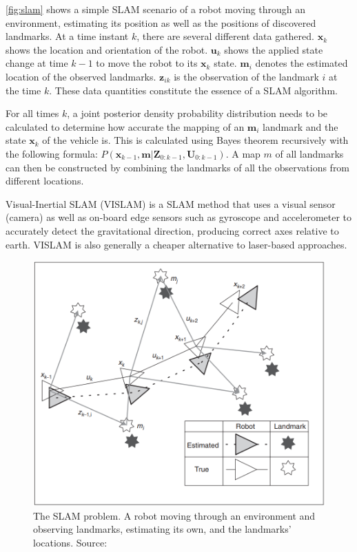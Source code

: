 \documentclass{article}
\begin{document}
\autoref{fig:slam} shows a simple SLAM scenario of a robot moving through an environment, estimating its position as well as the positions of discovered landmarks. At a time instant $k$, there are several different data gathered. $\textbf{x}_k$ shows the location and orientation of the robot. $\textbf{u}_k$ shows the applied state change at time $k-1$ to move the robot to its $\textbf{x}_k$ state. $\textbf{m}_i$ denotes the estimated location of the observed landmarks. $\textbf{z}_{ik}$ is the observation of the landmark $i$ at the time $k$. These data quantities constitute the essence of a SLAM algorithm. \cite{background1}

For all times $k$, a joint posterior density probability distribution needs to be calculated to determine how accurate the mapping of an $\textbf{m}_i$ landmark and the state $\textbf{x}_k$ of the vehicle is. This is calculated using Bayes theorem recursively with the following formula: $P(\textbf{x}_{k-1}, \textbf{m} | \textbf{Z}_{0:k-1}, \textbf{U}_{0:k-1})$. A map $m$ of all landmarks can then be constructed by combining the landmarks of all the observations from different locations. \cite{background1}

Visual-Inertial SLAM (VISLAM) is a SLAM method that uses a visual sensor (camera) as well as on-board edge sensors such as gyroscope and accelerometer to accurately detect the gravitational direction, producing correct axes relative to earth. VISLAM is also generally a cheaper alternative to laser-based approaches. \cite{vislam}


\begin{figure}[!htb]
    \centering
    \includegraphics[width=0.6\linewidth]{slam.PNG}
    \caption{The SLAM problem. A robot moving through an environment and observing landmarks, estimating its own, and the landmarks' locations. Source: \cite{background1}}
    \label{fig:slam}
\end{figure}
\end{document}
